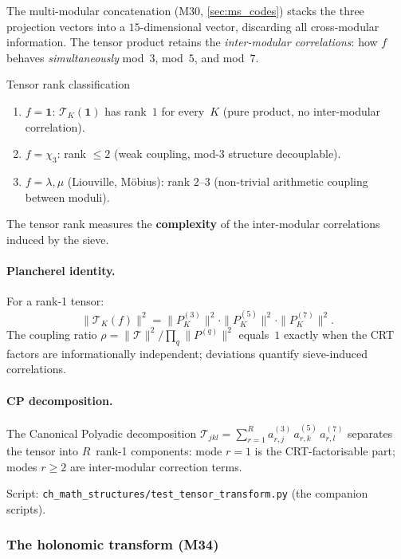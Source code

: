 \documentclass[12pt,a4paper]{article}
\begin{document}
The multi-modular concatenation (M30, \cref{sec:ms_codes}) stacks
the three projection vectors into a $15$-dimensional vector,
discarding all cross-modular information.  The tensor product
retains the \emph{inter-modular correlations}: how $f$ behaves
\emph{simultaneously} mod~$3$, mod~$5$, and mod~$7$.

\begin{thmbox}{Tensor rank classification}
\label{thm:tensor_rank}
\begin{enumerate}[nosep]
\item $f = \mathbf{1}$: $\mathcal{T}_K(\mathbf{1})$ has rank~$1$
  for every~$K$ (pure product, no inter-modular correlation).
\item $f = \chi_3$: rank $\leq 2$ (weak coupling, mod-3 structure
  decouplable).
\item $f = \lambda, \mu$ (Liouville, M\"obius): rank $2$--$3$
  (non-trivial arithmetic coupling between moduli).
\end{enumerate}
The tensor rank measures the \textbf{complexity} of the
inter-modular correlations induced by the sieve.
\end{thmbox}

\paragraph{Plancherel identity.}
For a rank-1 tensor:
\begin{equation}
  \|\mathcal{T}_K(f)\|^2
  = \|P_K^{(3)}\|^2 \cdot \|P_K^{(5)}\|^2 \cdot \|P_K^{(7)}\|^2.
  \label{eq:plancherel_tensor}
\end{equation}
The coupling ratio
$\rho = \|\mathcal{T}\|^2 / \prod_q \|P^{(q)}\|^2$
equals~$1$ exactly when the CRT factors are informationally
independent; deviations quantify sieve-induced correlations.

\paragraph{CP decomposition.}
The Canonical Polyadic decomposition
$\mathcal{T}_{jkl} = \sum_{r=1}^{R} a_{r,j}^{(3)} \, a_{r,k}^{(5)} \, a_{r,l}^{(7)}$
separates the tensor into $R$~rank-1 components: mode $r = 1$ is
the CRT-factorisable part; modes $r \geq 2$ are inter-modular
correction terms.

Script: \texttt{ch\_math\_structures/test\_tensor\_transform.py} (the companion scripts).


\subsubsection{The holonomic transform (M34)}
\label{sec:ms_holonomic_transform}
\end{document}
